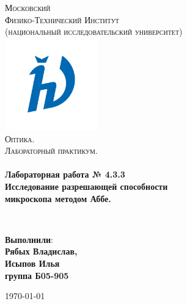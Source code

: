 \documentclass[a4paper,12pt]{article}
\begin{document}
\begin{titlepage}
	\begin{center}
		
		\textsc{\LARGE Московский\\[-0.2cm]Физико-Технический Институт\\[0.1cm]\large (национальный исследовательский университет)}\\[1.5cm] 
		
	\includegraphics[width=0.3\textwidth]{hv_s_no_bg.png}~\\[1cm]

	\textsc{\Large Оптика. \\ Лабораторный практикум. }\\[0.2cm]

	\HRule \\[0.4cm]
	{ \LARGE \bfseries Лабораторная работа № 4.3.3 \\ Исследование разрешающей способности \\ микроскопа методом Аббе. \\[0.4cm] }

	\HRule \\[1.5cm]
		
		\noindent
		\begin{minipage}{0.4\textwidth}
			\begin{flushleft} \large
			\end{flushleft}
		\end{minipage}%
		\begin{minipage}{0.4\textwidth}
			\begin{flushright} \large
			\end{flushright}
		\end{minipage}
		
		
		\large{\begin{flushright}
				\vfill
				\textbf{Выполнили}:\\
				\textbf{Рябых Владислав,\\}
				\textbf{Исыпов Илья\\}
				\textbf{группа Б05-905}
		\end{flushright}}
		
		
		{\large \today}\\
		
		
	\end{center}
\end{titlepage}
\end{document}
